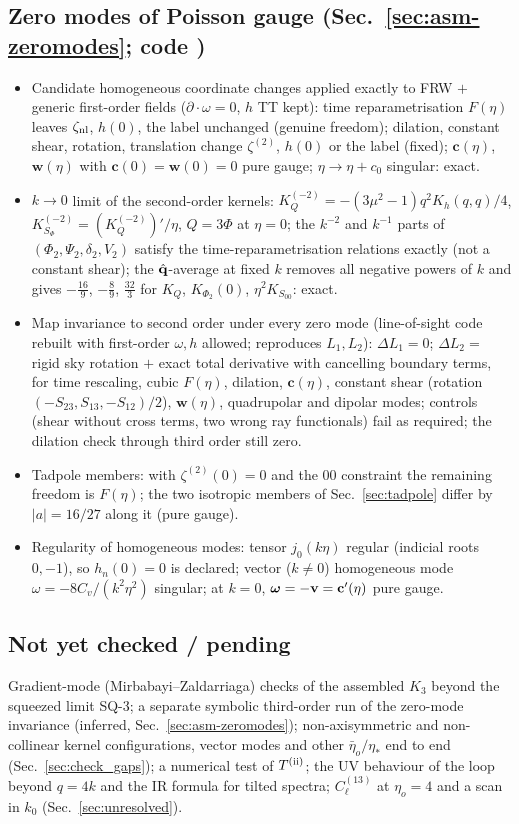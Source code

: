 \subsection*{Zero modes of Poisson gauge (Sec.~\ref{sec:asm-zeromodes}; code )}
\begin{itemize}\itemsep1pt
\item[ZM-1] Candidate homogeneous coordinate changes applied exactly to FRW $+$ generic first-order fields ($\partial\cdot\omega=0$, $h$ TT kept): time
reparametrisation $F(\eta)$ leaves $\zeta_{\rm nl}$, $h(0)$, the label unchanged (genuine freedom); dilation, constant shear, rotation, translation change
$\zeta^{(2)}$, $h(0)$ or the label (fixed); $\mathbf c(\eta)$, $\mathbf w(\eta)$ with $\mathbf c(0)=\mathbf w(0)=0$ pure gauge; $\eta\to\eta+c_0$ singular: exact.
\item[ZM-2] $k\to0$ limit of the second-order kernels: $K_Q^{(-2)}=-(3\mu^2-1)q^2K_h(q,q)/4$, $K_{S_\Phi}^{(-2)}=(K_Q^{(-2)})'/\eta$, $Q=3\Phi$ at $\eta=0$; the
$k^{-2}$ and $k^{-1}$ parts of $(\Phi_2,\Psi_2,\delta_2,V_2)$ satisfy the time-reparametrisation relations exactly (not a constant shear); the $\hat{\mathbf q}$-average
at fixed $k$ removes all negative powers of $k$ and gives $-\tfrac{16}9$, $-\tfrac89$, $\tfrac{32}3$ for $K_Q$, $K_{\Phi_2}(0)$, $\eta^2K_{S_{00}}$: exact.
\item[ZM-3] Map invariance to second order under every zero mode (line-of-sight code rebuilt with first-order $\omega,h$ allowed; reproduces $L_1,L_2$):
$\Delta L_1=0$; $\Delta L_2=$ rigid sky rotation $+$ exact total derivative with cancelling boundary terms, for time rescaling, cubic $F(\eta)$, dilation,
$\mathbf c(\eta)$, constant shear (rotation $(-S_{23},S_{13},-S_{12})/2$), $\mathbf w(\eta)$, quadrupolar and dipolar modes; controls (shear without cross terms, two
wrong ray functionals) fail as required; the dilation check through third order still zero.
\item[ZM-4] Tadpole members: with $\zeta^{(2)}(0)=0$ and the $00$ constraint the remaining freedom is $F(\eta)$; the two isotropic members of
Sec.~\ref{sec:tadpole} differ by $|a|=16/27$ along it (pure gauge).
\item[ZM-5] Regularity of homogeneous modes: tensor $j_0(k\eta)$ regular (indicial roots $0,-1$), so $h_n(0)=0$ is declared; vector ($k\ne0$) homogeneous mode
$\omega=-8C_v/(k^2\eta^2)$ singular; at $k=0$, $\boldsymbol\omega=-\mathbf v=\mathbf c'(\eta)$ pure gauge.
\end{itemize}

\subsection*{Not yet checked / pending}
Gradient-mode (Mirbabayi--Zaldarriaga) checks of the assembled $K_3$ beyond the squeezed limit SQ-3; a separate symbolic third-order run of the zero-mode
invariance (inferred, Sec.~\ref{sec:asm-zeromodes}); non-axisymmetric and non-collinear kernel configurations, vector modes and other $\bar\eta_o/\eta_*$ end
to end (Sec.~\ref{sec:check_gaps}); a numerical test of $T^{\rm(ii)}$; the UV behaviour of the loop beyond $q=4k$ and the IR formula for tilted
spectra; $C^{(13)}_\ell$ at $\eta_o=4$ and a scan in $k_0$ (Sec.~\ref{sec:unresolved}).
